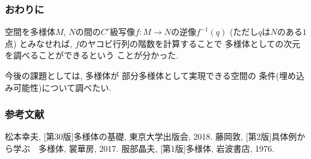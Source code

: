 \documentclass[dvipdfmx,cjk]{beamer}
\theoremstyle{definition}
\begin{document}

\begin{frame}
    \frametitle{おわりに}
  空間を多様体$M$, $N$の間の$C^r$級写像$f:M\to N$の逆像$f^{-1}(q)$
(ただし$q$は$N$のある$1$点)
とみなせれば, $f$のヤコビ行列の階数を計算することで
多様体としての次元を調べることができるという
ことが分かった. 

今後の課題としては, 多様体が
部分多様体として実現できる空間の
条件(埋め込み可能性)について調べたい. 
\end{frame}

\begin{frame}
\frametitle{参考文献} 
\begin{thebibliography}{1}
\beamertemplatetextbibitems
{} 松本幸夫, [第30版]多様体の基礎, 東京大学出版会, 2018.
   藤岡敦, [第2版]具体例から学ぶ　多様体, 裳華房, 2017.
   服部晶夫, [第1版]多様体, 岩波書店, 1976.
\end{thebibliography}
\end{frame}
\end{document}
